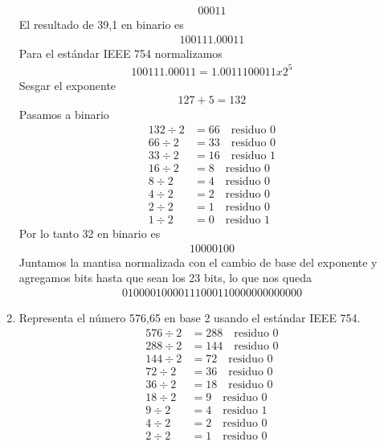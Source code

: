 \documentclass{article}
\begin{document}
\begin{enumerate}
\begin{align*}
        00011
    \end{align*}
    El resultado de 39,1 en binario es
    \begin{align*}
        100111.00011
    \end{align*}
    Para el estándar IEEE 754 normalizamos
    \begin{align*}
        100111.00011 = 1.0011100011 x 2^5
    \end{align*}
    Sesgar el exponente
    \begin{align*}
        127 + 5 = 132
    \end{align*}
    Pasamos a binario
    \begin{align*}
    132 \div 2 &= 66 \quad \text{residuo } 0 \\
    66 \div 2 &= 33 \quad \text{residuo } 0 \\
    33 \div 2 &= 16 \quad \text{residuo } 1 \\
    16 \div 2 &= 8 \quad \text{residuo } 0 \\
    8 \div 2 &= 4 \quad \text{residuo } 0 \\
    4 \div 2 &= 2 \quad \text{residuo } 0 \\
    2 \div 2 &= 1 \quad \text{residuo } 0 \\
    1 \div 2 &= 0 \quad \text{residuo } 1 
    \end{align*}
    Por lo tanto 32 en binario es 
    \begin{align*}
        10000100
    \end{align*}
    Juntamos la mantisa normalizada con el cambio de base del exponente y agregamos bits hasta que sean los 23 bits, lo que nos queda
    \begin{align*}
        01000010000111000110000000000000
    \end{align*}
    \item Representa el número 576,65 en base 2 usando el estándar IEEE 754.
    \begin{align*}
    576 \div 2&= 288 \quad \text{residuo } 0\\
    288 \div 2&= 144 \quad \text{residuo } 0\\
    144 \div 2&= 72 \quad \text{residuo } 0\\
    72 \div 2&= 36 \quad \text{residuo } 0\\
    36 \div 2&= 18 \quad \text{residuo } 0\\
    18 \div 2&= 9 \quad \text{residuo } 0\\
    9 \div 2&= 4 \quad \text{residuo } 1\\
    4 \div 2&= 2 \quad \text{residuo } 0\\
    2 \div 2&= 1 \quad \text{residuo } 0\\
    \end{align*}


\end{enumerate}
\end{document}
